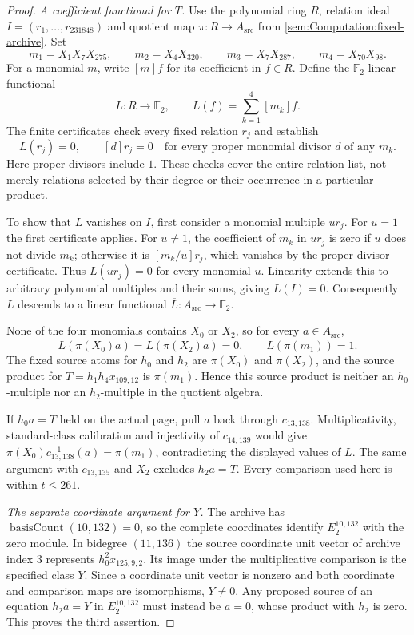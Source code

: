 \begin{proof}
\textit{A coefficient functional for $T$.}
Use the polynomial ring $R$, relation ideal $I=(r_1,\ldots,r_{231848})$
and quotient map $\pi:R\to A_{\mathrm{src}}$ from
\ref{sem:Computation:fixed-archive}. Set
\[
m_1=X_1X_7X_{275},\qquad m_2=X_4X_{320},\qquad
m_3=X_7X_{287},\qquad m_4=X_{70}X_{98}.
\]
For a monomial $m$, write $[m]f$ for its coefficient in $f\in R$.
Define the $\mathbb F_2$-linear functional
\[
L:R\longrightarrow\mathbb F_2,\qquad L(f)=\sum_{k=1}^{4}[m_k]f.
\]
The finite certificates check every fixed relation $r_j$ and establish
\[
L(r_j)=0,\qquad [d]r_j=0
\quad\text{for every proper monomial divisor $d$ of any $m_k$.}
\]
Here proper divisors include $1$. These checks cover the entire relation
list, not merely relations selected by their degree or their occurrence
in a particular product.

To show that $L$ vanishes on $I$, first consider a monomial multiple
$u r_j$. For $u=1$ the first certificate applies. For $u\ne1$, the
coefficient of $m_k$ in $u r_j$ is zero if $u$ does not divide $m_k$;
otherwise it is $[m_k/u]r_j$, which vanishes by the proper-divisor
certificate. Thus $L(u r_j)=0$ for every monomial $u$. Linearity extends
this to arbitrary polynomial multiples and their sums, giving $L(I)=0$.
Consequently $L$ descends to a linear functional
$\overline L:A_{\mathrm{src}}\to\mathbb F_2$.

None of the four monomials contains $X_0$ or $X_2$, so for every
$a\in A_{\mathrm{src}}$,
\[
\overline L(\pi(X_0)a)=\overline L(\pi(X_2)a)=0,
\qquad \overline L(\pi(m_1))=1.
\]
The fixed source atoms for $h_0$ and $h_2$ are $\pi(X_0)$ and $\pi(X_2)$,
and the source product for $T=h_1h_4x_{109,12}$ is $\pi(m_1)$.
Hence this source product is neither an $h_0$-multiple nor an
$h_2$-multiple in the quotient algebra.

If $h_0a=T$ held on the actual page, pull $a$ back through
$c_{13,138}$. Multiplicativity, standard-class calibration and
injectivity of $c_{14,139}$ would give
$\pi(X_0)c_{13,138}^{-1}(a)=\pi(m_1)$, contradicting the displayed
values of $\overline L$. The same argument with $c_{13,135}$ and $X_2$
excludes $h_2a=T$. Every comparison used here is within $t\leq261$.

\textit{The separate coordinate argument for $Y$.}
The archive has $\operatorname{basisCount}(10,132)=0$, so the complete
coordinates identify $E_2^{10,132}$ with the zero module. In bidegree
$(11,136)$ the source coordinate unit vector of archive index $3$
represents $h_0^2x_{125,9,2}$. Its image under the multiplicative
comparison is the specified class $Y$. Since a coordinate unit vector
is nonzero and both coordinate and comparison maps are isomorphisms,
$Y\ne0$. Any proposed source of an equation $h_2a=Y$ in
$E_2^{10,132}$ must instead be $a=0$, whose product with $h_2$ is zero.
This proves the third assertion.


\end{proof}
